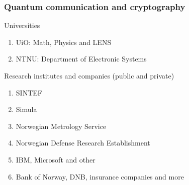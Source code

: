 \documentclass{beamer}
\begin{document}
\begin{frame}
\frametitle{Quantum communication and cryptography}

\begin{block}{Universities }
\begin{enumerate}
\item UiO: Math, Physics and LENS

\item NTNU: Department of Electronic Systems
\end{enumerate}

\noindent
\end{block}

\begin{block}{Research institutes and companies (public and private) }
\begin{enumerate}
\item SINTEF

\item Simula

\item Norwegian Metrology Service

\item Norwegian Defense Research Establishment

\item IBM, Microsoft and other

\item Bank of Norway, DNB, insurance companies and more
\end{enumerate}

\noindent
\end{block}
\end{frame}
\end{document}
